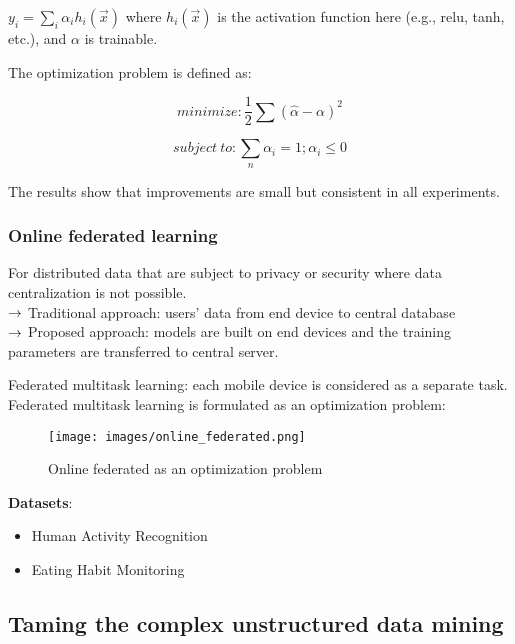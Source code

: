 $y_i=\sum_{i}\alpha_ih_i(\vec{x})$ where $h_i(\vec{x})$ is the activation function here (e.g., relu, tanh, etc.), and $\alpha$ is trainable. 

The optimization problem is defined as:

$$
minimize: \frac{1}{2}\sum(\hat{\alpha} - \alpha)^2
$$

$$
subject\ to: \sum_{n}\alpha_i = 1; \alpha_i \leq 0
$$

The results show that improvements are small but consistent in all experiments.

\subsubsection{Online federated learning}

For distributed data that are subject to privacy or security where data centralization is not possible.\\

$\rightarrow$ Traditional approach: users' data from end device to central database\\
$\rightarrow$ Proposed approach: models are built on end devices and the training parameters are transferred to central server. \\


Federated multitask learning: each mobile device is considered as a separate task. \\

Federated multitask learning is formulated as an optimization problem:

\begin{figure}
    \centering
    \texttt{[image: images/online\_federated.png]}
    \caption{Online federated as an optimization problem}
    \label{fig:my_label}
\end{figure}{}

{\bf Datasets}:

\begin{itemize}
    \item Human Activity Recognition 
    \item Eating Habit Monitoring
\end{itemize}{}



\subsection{Taming the complex unstructured data mining}

